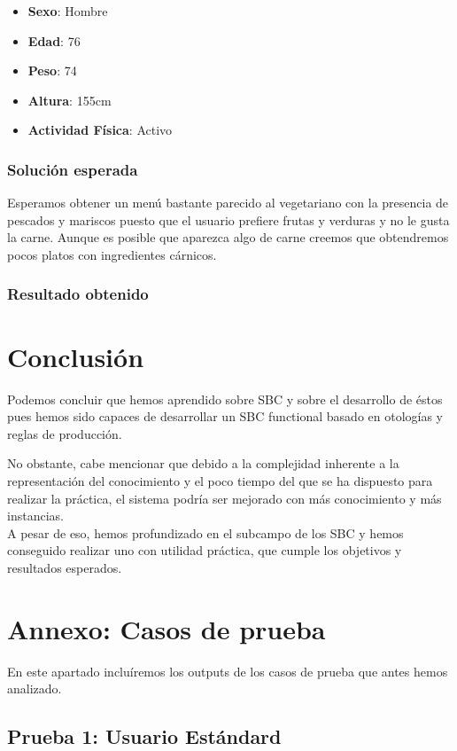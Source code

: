 \documentclass[12]{article}
\begin{document}
\begin{itemize}
\item \textbf{Sexo}: Hombre
\item \textbf{Edad}: 76
\item \textbf{Peso}: 74
\item \textbf{Altura}: 155cm
\item \textbf{Actividad Física}: Activo
\end{itemize}
\subsubsection{Solución esperada}
Esperamos obtener un menú bastante parecido al vegetariano con la presencia de pescados y mariscos puesto que el usuario prefiere frutas y verduras y no le gusta la carne. Aunque es posible que aparezca algo de carne creemos que obtendremos pocos platos con ingredientes cárnicos. 

\subsubsection{Resultado obtenido}

\section{Conclusión}
Podemos concluir que hemos aprendido sobre SBC y sobre el desarrollo de éstos pues hemos sido capaces de desarrollar un SBC functional basado en otologías y reglas de producción.

No obstante, cabe mencionar que debido a la complejidad inherente a la representación del conocimiento y el poco tiempo del que se ha dispuesto para realizar la práctica, el sistema podría ser mejorado con más conocimiento y más instancias. 
\\

A pesar de eso, hemos profundizado en el subcampo de los SBC y hemos conseguido realizar uno con utilidad práctica, que cumple los objetivos y resultados esperados.

\section{Annexo: Casos de prueba}
En este apartado incluíremos los outputs de los casos de prueba que antes hemos analizado.

\subsection{Prueba 1: Usuario Estándard}
\end{document}
